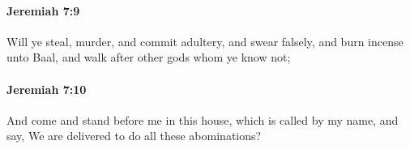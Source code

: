 		\paragraph{Jeremiah 7:9} %
			\label{JEREMIAH-7-9}

			Will ye steal, murder, and commit adultery, and swear falsely, and burn incense unto Baal, and walk after other gods whom ye know not;


		\paragraph{Jeremiah 7:10} %
			\label{JEREMIAH-7-10}

			And come and stand before me in this house, which is called by my name, and say, We are delivered to do all these abominations?


